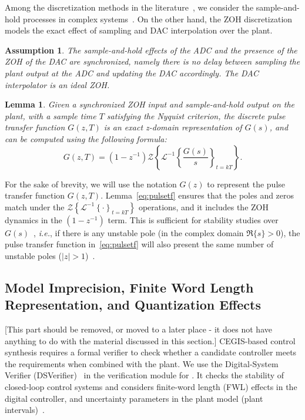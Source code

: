 \documentclass[final]{sig-alternate-05-2015}
\newcommand{\red}[1]{{\color{red}#1}}
\newtheorem{myassumption}{Assumption}
\newtheorem{mylemma}{Lemma}
\begin{document}
Among the discretization methods in the literature~\cite{Franklin15}, 
we consider the sample-and-hold processes in complex systems~\cite{istepanian2012digital}.  
On the other hand, 
the ZOH discretization models the exact effect of sampling and DAC interpolation over the plant.

\begin{myassumption}
%
The sample-and-hold effects of the ADC and the presence of the ZOH of the DAC are synchronized,
namely there is no delay between sampling the plant output at the ADC and
updating the DAC accordingly.  The DAC interpolator is an ideal ZOH. 
%
\end{myassumption}

\begin{mylemma}\cite{astrom1997computer}
%
Given a synchronized ZOH input and sample-and-hold output on the plant, 
with a sample time $T$ satisfying the Nyquist criterion, the discrete pulse
transfer function $G(z,T)$ is an exact z-domain representation of $G(s)$, 
and can be computed using the following formula:
%
\begin{equation}
\label{eq:pulsetf}
G(z,T) = %
(1-z^{-1})\mathcal{Z}\left\lbrace{\mathcal{L}^{-1}\left\lbrace{\frac{G(s)}{s}}\right\rbrace_{t=kT}}\right\rbrace.
\end{equation}
%
\end{mylemma}
%
For the sake of brevity, we will use the notation $G(z)$ to represent the
pulse transfer function $G(z,T)$.
% 
Lemma~\ref{eq:pulsetf} ensures that the poles and zeros match under the
$\mathcal{Z}\left\lbrace{\mathcal{L}^{-1}\left\lbrace{\cdot}\right\rbrace_{t=kT}}\right\rbrace$
operations, and it includes the ZOH dynamics in the $(1-z^{-1})$ term. 
This is sufficient for stability studies over $G(s)$~\cite{fadali}, {\it i.e.}, if there is any unstable pole (in the complex domain $\Re\{s\} > 0$), 
the pulse transfer function in~\eqref{eq:pulsetf} will also present the same number of unstable poles ($|z| > 1$)~\cite{Franklin15}.

\subsection{Model Imprecision, Finite Word Length Representation, and Quantization Effects}
\label{verifying-closed-loop-control-systems}

\red{[This part should be removed, or moved to a later place - it does not have anything to do with the material discussed in this section.]
CEGIS-based control synthesis requires a formal verifier to check whether a
candidate controller meets the requirements when combined with the plant. 
We use the Digital-System Verifier (DSVerifier)~\cite{IsmailBCFF15} in the
verification module for \tool.  It checks the stability of closed-loop control systems and
considers finite-word length (FWL) effects in the digital controller, and
uncertainty parameters in the plant model (plant intervals)~\cite{Bessa16}.   
}
\end{document}
